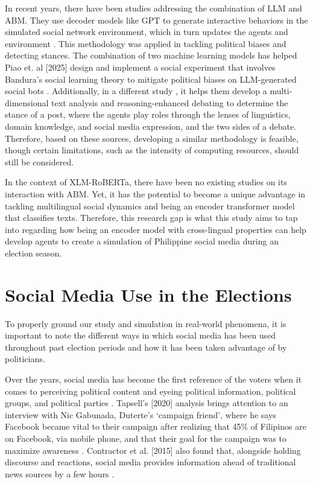 In recent years, there have been studies addressing the combination of LLM and ABM. They use decoder models like GPT to generate interactive behaviors in the simulated social network environment, which in turn updates the agents and environment \cite{Gao-2025, Lan-2024, Piao-2025}. This methodology was applied in tackling political biases and detecting stances. The combination of two machine learning models has helped Piao et. al [2025] design and implement a social experiment that involves Bandura’s social learning theory to mitigate political biases on LLM-generated social bots \cite{Piao-2025}. Additionally, in a different study \cite{Lan-2024}, it helps them develop a multi-dimensional text analysis and reasoning-enhanced debating to determine the stance of a post, where the agents play roles through the lenses of linguistics, domain knowledge, and social media expression, and the two sides of a debate.  Therefore, based on these sources, developing a similar methodology is feasible, though certain limitations, such as the intensity of computing resources, should still be considered.

In the context of XLM-RoBERTa, there have been no existing studies on its interaction with ABM. Yet, it has the potential to become a unique advantage in tackling multilingual social dynamics and being an encoder transformer model that classifies texts. Therefore, this research gap is what this study aims to tap into regarding how being an encoder model with cross-lingual properties can help develop agents to create a simulation of Philippine social media during an election season.


\section{Social Media Use in the Elections}
To properly ground our study and simulation in real-world phenomena, it is important to note the different ways in which social media has been used throughout past election periods and how it has been taken advantage of by politicians.

Over the years, social media has become the first reference of the voters when it comes to perceiving political content and eyeing political information, political groups, and political parties \cite{Campanero-2021}. Tapsell’s [2020] analysis brings attention to an interview with Nic Gabunada, Duterte’s ‘campaign friend’, where he says Facebook became vital to their campaign after realizing that 45\% of Filipinos are on Facebook, via mobile phone, and that their goal for the campaign was to maximize awareness \cite{Tapsell-2020}. Contractor et al. [2015] also found that, alongside holding discourse and reactions, social media provides information ahead of traditional news sources by a few hours \cite{Contractor-2015}.

